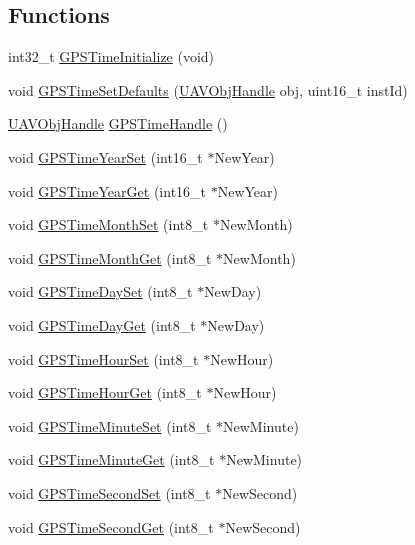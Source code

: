 \subsection*{\-Functions}
\begin{DoxyCompactItemize}
\item 
int32\-\_\-t \hyperlink{group___g_p_s_time_ga332e162991009e40a83069d47bc5dae1}{\-G\-P\-S\-Time\-Initialize} (void)
\item 
void \hyperlink{group___g_p_s_time_ga61496d596882e1f9de3e98252686d648}{\-G\-P\-S\-Time\-Set\-Defaults} (\hyperlink{targets_2_u_a_v_objects_2inc_2uavobjectmanager_8h_a279053e22be53ce9f895043aaeb91e3b}{\-U\-A\-V\-Obj\-Handle} obj, uint16\-\_\-t inst\-Id)
\item 
\hyperlink{targets_2_u_a_v_objects_2inc_2uavobjectmanager_8h_a279053e22be53ce9f895043aaeb91e3b}{\-U\-A\-V\-Obj\-Handle} \hyperlink{group___g_p_s_time_gacce9fb84765810ae128b4295ac126a95}{\-G\-P\-S\-Time\-Handle} ()
\item 
void \hyperlink{group___g_p_s_time_ga36272b8aa2aaccc7a234e6e7ed73f945}{\-G\-P\-S\-Time\-Year\-Set} (int16\-\_\-t $\ast$\-New\-Year)
\item 
void \hyperlink{group___g_p_s_time_ga1bab9f0a17fc56db7ef71803cc3795c5}{\-G\-P\-S\-Time\-Year\-Get} (int16\-\_\-t $\ast$\-New\-Year)
\item 
void \hyperlink{group___g_p_s_time_ga0d120b9bfe8186d88c96ead3c6b3b8ba}{\-G\-P\-S\-Time\-Month\-Set} (int8\-\_\-t $\ast$\-New\-Month)
\item 
void \hyperlink{group___g_p_s_time_gae93a8636045fc12481cbf877f2ecfd4c}{\-G\-P\-S\-Time\-Month\-Get} (int8\-\_\-t $\ast$\-New\-Month)
\item 
void \hyperlink{group___g_p_s_time_gaa873f5bcf2510d8fcf8e15604566cd04}{\-G\-P\-S\-Time\-Day\-Set} (int8\-\_\-t $\ast$\-New\-Day)
\item 
void \hyperlink{group___g_p_s_time_gadc53a8818d35eb1e00e6abdd3a396f8b}{\-G\-P\-S\-Time\-Day\-Get} (int8\-\_\-t $\ast$\-New\-Day)
\item 
void \hyperlink{group___g_p_s_time_gaa12d6a0e1a49157d47d8e246800a0177}{\-G\-P\-S\-Time\-Hour\-Set} (int8\-\_\-t $\ast$\-New\-Hour)
\item 
void \hyperlink{group___g_p_s_time_gab10de57fd411eabc7de698d43621b624}{\-G\-P\-S\-Time\-Hour\-Get} (int8\-\_\-t $\ast$\-New\-Hour)
\item 
void \hyperlink{group___g_p_s_time_ga78b2ec1a663dcd589632b3b69a48db8a}{\-G\-P\-S\-Time\-Minute\-Set} (int8\-\_\-t $\ast$\-New\-Minute)
\item 
void \hyperlink{group___g_p_s_time_ga2db39fed4b4703e4170c799fb5df272c}{\-G\-P\-S\-Time\-Minute\-Get} (int8\-\_\-t $\ast$\-New\-Minute)
\item 
void \hyperlink{group___g_p_s_time_gaacd7f2a5eb518b4b2ac5b2354d3c8d5a}{\-G\-P\-S\-Time\-Second\-Set} (int8\-\_\-t $\ast$\-New\-Second)
\item 
void \hyperlink{group___g_p_s_time_ga10a9f90e5ee9534725598cb73c788114}{\-G\-P\-S\-Time\-Second\-Get} (int8\-\_\-t $\ast$\-New\-Second)
\end{DoxyCompactItemize}



